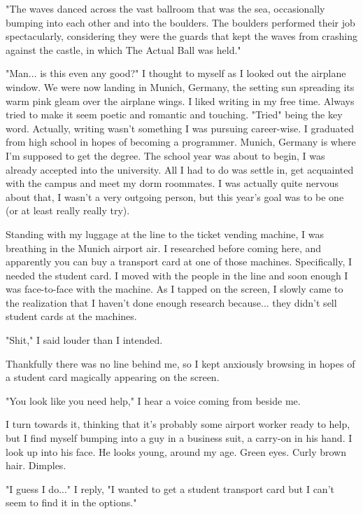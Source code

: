"The waves danced across the vast ballroom that was the sea, occasionally bumping into each other and into the boulders. The boulders performed their job spectacularly, considering they were the guards that kept the waves from crashing against the castle, in which The Actual Ball was held."

"Man... is this even any good?" I thought to myself as I looked out the airplane window. We were now landing in Munich, Germany, the setting sun spreading its warm pink gleam over the airplane wings. I liked writing in my free time. Always tried to make it seem poetic and romantic and touching. "Tried" being the key word. Actually, writing wasn't something I was pursuing career-wise. I graduated from high school in hopes of becoming a programmer. Munich, Germany is where I'm supposed to get the degree. The school year was about to begin, I was already accepted into the university. All I had to do was settle in, get acquainted with the campus and meet my dorm roommates. I was actually quite nervous about that, I wasn't a very outgoing person, but this year's goal was to be one (or at least really really try).

\bigskip

Standing with my luggage at the line to the ticket vending machine, I was breathing in the Munich airport air. I researched before coming here, and apparently you can buy a transport card at one of those machines. Specifically, I needed the student card. I moved with the people in the line and soon enough I was face-to-face with the machine. As I tapped on the screen, I slowly came to the realization that I haven't done enough research because... they didn't sell student cards at the machines.

"Shit," I said louder than I intended.

Thankfully there was no line behind me, so I kept anxiously browsing in hopes of a student card magically appearing on the screen.

"You look like you need help," I hear a voice coming from beside me.

I turn towards it, thinking that it's probably some airport worker ready to help, but I find myself bumping into a guy in a business suit, a carry-on in his hand. I look up into his face. He looks young, around my age. Green eyes. Curly brown hair. Dimples.

"I guess I do..." I reply, "I wanted to get a student transport card but I can't seem to find it in the options."

